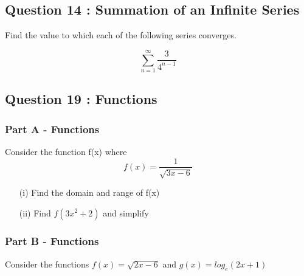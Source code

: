 \documentclass[]{article}
\begin{document}
\subsection*{Question 14 : Summation of an Infinite Series}

Find the value to which each of the following series converges.

\[\sum_{n=1}^{\infty} \frac{3}{4^{n-1}}\]

	

%
%
%
%
%	
\subsection*{Question 19 : Functions}

\subsubsection*{Part A - Functions}
Consider the function f(x) where \[ f(x) = \frac{1}{\sqrt{3x-6}} \]




\begin{itemize}
	\item[(i)] Find the domain and range of f(x)
	\item[(ii)] Find $f(3x^2 + 2)$ and simplify
\end{itemize}


\subsubsection*{Part B - Functions}
Consider the functions $f(x) = \sqrt{2x-6}$ and  $g(x) = log_e(2x + 1)$
\end{document}
